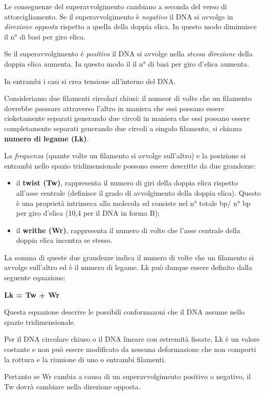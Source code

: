 \documentclass[]{article}
\begin{document}
Le conseguenze del superavvolgimento cambiano a seconda del verso di
attorcigliamento. Se il superavvolgimento è \emph{negativo} il DNA si
avvolge in \emph{direzione opposta} rispetto a quella della doppia
elica. In questo modo diminuisce il n° di basi per giro elica.

Se il superavvolgimento é \emph{positivo} il DNA si avvolge nella
\emph{stessa direzione} della doppia elica aumenta. In questo modo il il
n° di basi per giro d'elica aumenta.

In entrambi i casi si crea tensione all'interno del DNA.

Consideriamo due filamenti circolari chiusi: il numeor di volte che un
filamento dovrebbe passsare attraverso l'altro in maniera che essi
possano essere cioketamente separati generando due circoli in maniera
che essi possano essere completamente separati generando due circoli a
singolo filamento, si chiama \textbf{numero di legame (Lk)}.

La \emph{frequenza} (quante volte un filamento si avvolge sull'altro) e
la posizione si entrambi nello spazio tridimensionale possono essere
descritte da due grandezze:

\begin{itemize}
\itemsep1pt\parskip0pt
\item
  il \textbf{twist (Tw)}, rappresenta il numero di giri della doppia
  elica rispetto all'asse centrale (definisce il grado di avvolgimento
  della doppia elica). Questo è una proprietà intrinseca alla molecola
  ed consiste nel n° totale bp/ n° bp per giro d'elica (10,4 per il DNA
  in forma B);
\item
  il \textbf{writhe (Wr)}, rappresenta il numero di volte che l'asse
  centrale della doppia elica incontra se stesso.
\end{itemize}

La somma di queste due grandezze indica il numero di volte che un
filamento si avvolge sull'altro ed è il numero di legame. Lk può dunque
essere definito dalla seguente equazione:

\textbf{Lk = Tw + Wr}

Questa equazione descrive le possibili conformazoni che il DNA assume
nello spazio tridimensionale.

Per il DNA circolare chiuso o il DNA lineare con estremità fissate, Lk è
un valore costante e non può essere modificato da nessuna deformazione
che non comporti la rottura e la riunione di uno o entrambi filamenti.

Pertanto se Wr cambia a causa di un superavvolgimento positivo o
negativo, il Tw dovrà cambiare nella direzione opposta.
\end{document}
